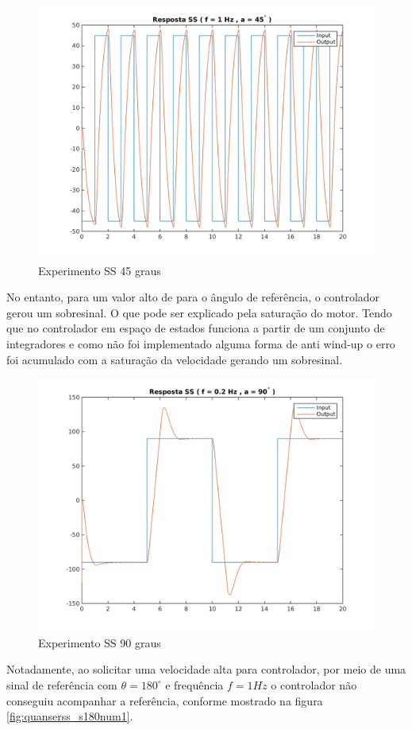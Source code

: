 \documentclass[a4paper,11pt]{article}
\begin{document}
\begin{figure}[H]
    \centering
    \includegraphics[width=0.8\linewidth]{tex/img/quanserss_s45num1.png}
    \caption{Experimento SS 45 graus}
    \label{fig:quanserss_s45num1}
\end{figure}


No entanto, para um valor alto de para o ângulo de referência, o controlador gerou um sobresinal. O que pode ser explicado pela saturação do motor. Tendo que no controlador em espaço de estados funciona a partir de um conjunto de integradores e como não foi implementado alguma forma de anti wind-up o erro foi acumulado com a saturação da velocidade gerando um sobresinal.

\begin{figure}[H]
    \centering
    \includegraphics[width=0.8\linewidth]{tex/img/quanserss_s90num5.png}
    \caption{Experimento SS 90 graus}
    \label{fig:quanserss_s90num5}
\end{figure}

Notadamente, ao solicitar uma velocidade alta para controlador, por meio de uma sinal de referência com $\theta = 180^\circ$ e frequência $f = 1Hz$ o controlador não conseguiu acompanhar a referência, conforme mostrado na figura \ref{fig:quanserss_s180num1}.
\end{document}
